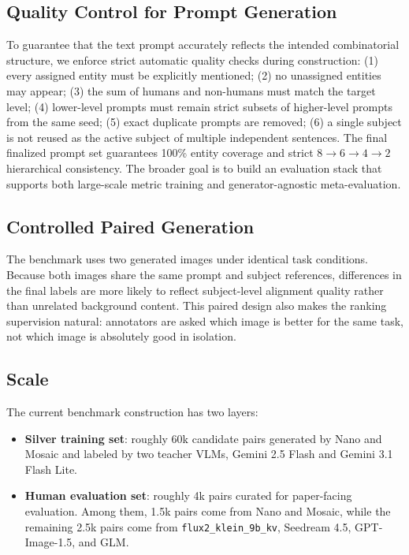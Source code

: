 \subsection{Quality Control for Prompt Generation}
To guarantee that the text prompt accurately reflects the intended combinatorial structure, we enforce strict automatic quality checks during construction: (1) every assigned entity must be explicitly mentioned; (2) no unassigned entities may appear; (3) the sum of humans and non-humans must match the target level; (4) lower-level prompts must remain strict subsets of higher-level prompts from the same seed; (5) exact duplicate prompts are removed; (6) a single subject is not reused as the active subject of multiple independent sentences. The final finalized prompt set guarantees 100\% entity coverage and strict $8 \rightarrow 6 \rightarrow 4 \rightarrow 2$ hierarchical consistency. The broader goal is to build an evaluation stack that supports both large-scale metric training and generator-agnostic meta-evaluation.

\subsection{Controlled Paired Generation}
The benchmark uses two generated images under identical task conditions. Because both images share the same prompt and subject references, differences in the final labels are more likely to reflect subject-level alignment quality rather than unrelated background content. This paired design also makes the ranking supervision natural: annotators are asked which image is better for the same task, not which image is absolutely good in isolation.

\subsection{Scale}
The current benchmark construction has two layers:
\begin{itemize}
    \item \textbf{Silver training set}: roughly 60k candidate pairs generated by Nano and Mosaic and labeled by two teacher VLMs, Gemini 2.5 Flash and Gemini 3.1 Flash Lite.
    \item \textbf{Human evaluation set}: roughly 4k pairs curated for paper-facing evaluation. Among them, 1.5k pairs come from Nano and Mosaic, while the remaining 2.5k pairs come from \texttt{flux2\_klein\_9b\_kv}, Seedream 4.5, GPT-Image-1.5, and GLM.
\end{itemize}

